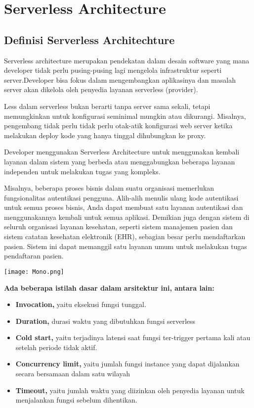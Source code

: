 
\chapter{Serverless Architecture}

	
\section{Definisi Serverless Architechture}
Serverless architecture merupakan pendekatan dalam desain software yang mana developer tidak perlu pusing-pusing lagi mengelola infrastruktur seperti server.Developer bisa fokus dalam mengembangkan aplikasinya dan masalah server akan dikelola oleh penyedia layanan serverless (provider).

Less dalam serverless bukan berarti tanpa server sama sekali, tetapi memungkinkan untuk konfigurasi seminimal mungkin atau dikurangi. Misalnya, pengembang tidak perlu tidak perlu otak-atik konfigurasi web server ketika melakukan deploy kode yang hanya tinggal dihubungkan ke proxy.

Developer menggunakan Serverless Architecture untuk menggunakan kembali layanan dalam sistem yang berbeda atau menggabungkan beberapa layanan independen untuk melakukan tugas yang kompleks. 

Misalnya, beberapa proses bisnis dalam suatu organisasi memerlukan fungsionalitas autentikasi pengguna. Alih-alih menulis ulang kode autentikasi untuk semua proses bisnis, Anda dapat membuat satu layanan autentikasi dan menggunakannya kembali untuk semua aplikasi. Demikian juga dengan sistem di seluruh organisasi layanan kesehatan, seperti sistem manajemen pasien dan sistem catatan kesehatan elektronik (EHR), sebagian besar perlu mendaftarkan pasien. Sistem ini dapat memanggil satu layanan umum untuk melakukan tugas pendaftaran pasien.

\texttt{[image: Mono.png]}

\textbf{Ada beberapa istilah dasar dalam arsitektur ini, antara lain:}

\begin{itemize}
	\item \textbf{Invocation,} yaitu eksekusi fungsi tunggal.
	\item \textbf{Duration,} durasi waktu yang dibutuhkan fungsi serverless
	\item \textbf{Cold start,} yaitu terjadinya latensi saat fungsi ter-trigger pertama kali atau setelah periode tidak aktif.
	\item \textbf{Concurrency limit,} yaitu jumlah fungsi instance yang dapat dijalankan secara bersamaan dalam satu wilayah
	\item \textbf{Timeout,} yaitu jumlah waktu yang diizinkan oleh penyedia layanan untuk menjalankan fungsi sebelum dihentikan.
\end{itemize}

